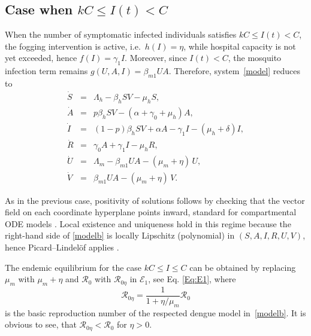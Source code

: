 \documentclass[preprint]{elsarticle}
\begin{document}


\subsection{Case when $kC \leq I(t) < C$}

When the number of symptomatic infected individuals satisfies $kC \le I(t)<C$, the fogging intervention is active, i.e.\ $h(I)=\eta$, while hospital capacity is not yet exceeded, hence $f(I)=\gamma_1 I$. Moreover, since $I(t)<C$, the mosquito infection term remains $g(U,A,I)=\beta_{m1}UA$. Therefore, system~\eqref{model} reduces to
\begin{eqnarray}\label{modelb}
\dot{S} &=& \Lambda_h - \beta_h S V - \mu_h S, \nonumber\\
\dot{A} &=& p \beta_h S V - \left(\alpha + \gamma_0 + \mu_h\right)A, \nonumber\\
\dot{I} &=& (1-p)\beta_h S V + \alpha A - \gamma_1 I - (\mu_h + \delta)I, \nonumber\\
\dot{R} &=& \gamma_0 A + \gamma_1 I - \mu_h R, \nonumber\\
\dot{U} &=& \Lambda_m - \beta_{m1}UA - (\mu_m+\eta)\,U, \nonumber\\
\dot{V} &=& \beta_{m1}UA - (\mu_m+\eta)\,V.
\end{eqnarray}

As in the previous case, positivity of solutions follows by checking that the vector field on each coordinate hyperplane points inward, standard for compartmental ODE models \cite{hethcote2000mathematics,smith1995theory}. Local existence and uniqueness hold in this regime because the right-hand side of \eqref{modelb} is locally Lipschitz (polynomial) in $(S,A,I,R,U,V)$, hence Picard--Lindel\"of applies \cite{coddington1955theory}.

The endemic equilibrium for the case $kC\le I \le C$ can be obtained by replacing $\mu_m$ with $\mu_m + \eta$ and $\mathcal{R}_0$ with $\mathcal{R}_{0\eta}$ in $\mathcal{E}_1$, see Eq. \eqref{Eq:E1}, where
\begin{equation}
    \mathcal{R}_{0\eta} = \frac{1}{1+\eta/\mu_m} \mathcal{R}_{0}
\end{equation}
is the basic reproduction number of the respected dengue model in~\eqref{modelb}. It is obvious to see, that $\mathcal{R}_{0\eta}<\mathcal{R}_0$ for $\eta>0$.
\end{document}
